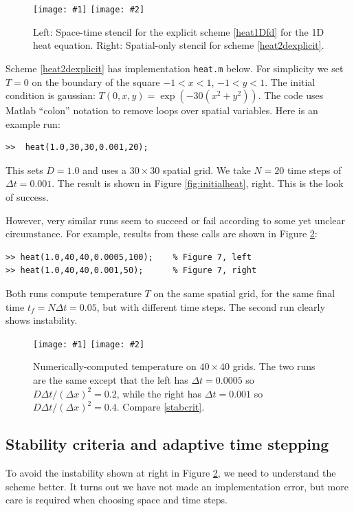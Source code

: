 \documentclass[letterpaper,final,12pt,reqno]{amsart}
\newcommand{\minput}[1]{
\vspace{0.8cm}
\VerbatimInput[frame=single,framesep=3mm,label=\fbox{\normalsize \textsl{\,#1.m\,}},fontfamily=courier,fontsize=\footnotesize]{../mfiles/#1.slim.m}
\vspace{0.5cm}
}
\newcommand{\twofigsizes}[5]{
\begin{figure}[ht]
\centering
\texttt{[image: \#1]} \quad
\texttt{[image: \#2]}
\caption{#3}
\label{fig:#1}
\end{figure}}
\newcommand{\twofig}[3]{\twofigsizes{#1}{#2}{#3}{2.5in}{2.5in}}
\begin{document}
\twofigsizes{expstencil}{exp2dstencil}{Left: Space-time stencil for the explicit scheme \eqref{heat1Dfd} for the 1D heat equation.  Right: Spatial-only stencil for scheme \eqref{heat2dexplicit}.}{2.0in}{2.1in}

Scheme \eqref{heat2dexplicit} has implementation \texttt{heat.m} below.  For simplicity we set $T=0$ on the boundary of the square $-1 < x < 1$, $-1 < y < 1$.  The initial condition is gaussian: $T(0,x,y) = \exp(-30 (x^2+y^2))$.  The code uses Matlab ``colon'' notation to remove loops over spatial variables.  Here is an example run:
\begin{Verbatim}
>>  heat(1.0,30,30,0.001,20);
\end{Verbatim}
This sets $D=1.0$ and uses a $30\times 30$ spatial grid.  We take $N=20$ time steps of $\Delta t = 0.001$.  The result is shown in Figure \ref{fig:initialheat}, right.  This is the look of success.

\minput{heat}

However, very similar runs seem to succeed or fail according to some yet unclear circumstance.  For example, results from these calls are shown in Figure \ref{fig:stability}:
\begin{Verbatim}
>> heat(1.0,40,40,0.0005,100);    % Figure 7, left
>> heat(1.0,40,40,0.001,50);      % Figure 7, right
\end{Verbatim}
Both runs compute temperature $T$ on the same spatial grid, for the same final time $t_f = N \Delta t = 0.05$, but with different time steps.  The second run clearly shows instability.

\twofig{stability}{instability}{Numerically-computed temperature on $40\times 40$ grids.  The two runs are the same except that the left has $\Delta t=0.0005$ so $D\Delta t/(\Delta x)^2= 0.2$, while the right has $\Delta t=0.001$ so $D\Delta t/(\Delta x)^2= 0.4$.  Compare \eqref{stabcrit}.}


\subsection*{Stability criteria and adaptive time stepping}  To avoid the instability shown at right in Figure \ref{fig:stability}, we need to understand the scheme better.  It turns out we have not made an implementation error, but more care is required when choosing space and time steps.
\end{document}
